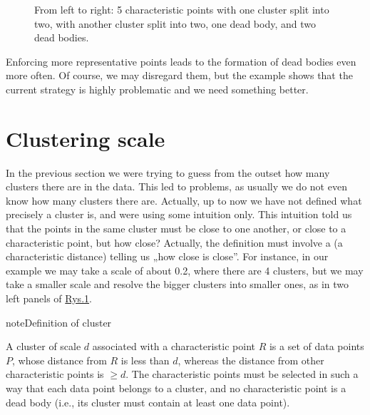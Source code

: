 \documentclass[a4paper,12pt,polish]{jupyterBook}
\let\sphinxpxdimen\pdfpxdimen\else\newdimen\sphinxpxdimen
\begin{document}
\begin{figure}[htbp]
\centering
\capstart

\noindent\sphinxincludegraphics[width=870\sphinxpxdimen]{{cl5}.jpg}
\caption{From left to right: 5 characteristic points with one cluster split into two, with another cluster split into two, one dead body, and two dead bodies.}\label{\detokenize{docs/unsupervised:id1}}\end{figure}

\sphinxAtStartPar
Enforcing more representative points leads to the formation of dead bodies even more often. Of course, we may disregard them, but the example shows that the current strategy is highly problematic and we need something better.


\section{Clustering scale}
\label{\detokenize{docs/unsupervised:clustering-scale}}
\sphinxAtStartPar
In the previous section we were trying to guess from the outset how many clusters there are in the data. This led to problems, as usually we do not even know how many clusters there are. Actually, up to now we have not defined what precisely a cluster is, and were using some intuition only. This intuition told us that the points in the same cluster must be close to one another, or close to a characteristic point, but how close? Actually, the definition must involve a  (a characteristic distance) telling us „how close is close”. For instance, in our example we may take a scale of about 0.2, where there are 4 clusters, but we may take a smaller scale and resolve the bigger clusters into smaller ones, as in two left panels of \hyperref[\detokenize{docs/unsupervised:id1}]{Rys.\@ \ref{\detokenize{docs/unsupervised:id1}}}.

\begin{sphinxadmonition}{note}{Definition of cluster}

\sphinxAtStartPar
A cluster of scale \(d\) associated with a characteristic point \(R\) is a set of data points \(P\), whose distance from \(R\) is less than \(d\), whereas the distance from other characteristic points is \(\ge d\). The characteristic points must be selected in such a way that each data point belongs to a cluster, and no characteristic point is a dead body (i.e., its cluster must contain at least one data point).
\end{sphinxadmonition}
\end{document}
